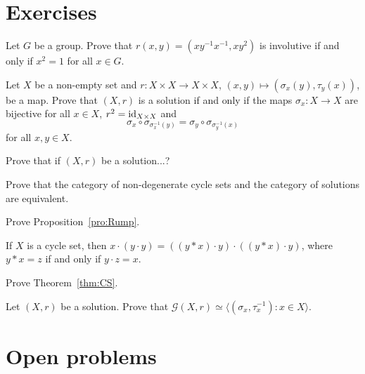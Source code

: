 \section*{Exercises}

\begin{prob}
\label{prob:Wada}
Let $G$ be a group. Prove that $r(x,y)=(xy^{-1}x^{-1},xy^2)$ 
is involutive if and only if $x^2=1$ for all $x\in G$. 
\end{prob}

\begin{prob}
Let $X$ be a  non-empty set and $r\colon X\times X\to X\times X$, $(x,y)\mapsto (\sigma_x(y),\tau_y(x))$, be a map.
Prove that $(X,r)$ is a solution if and only if 
the maps $\sigma_x\colon X\to X$ are bijective for all $x\in X$,
$r^2=\operatorname{id}_{X\times X}$ and 
\[
\sigma_x\circ\sigma_{\sigma^{-1}_x(y)}=\sigma_y\circ\sigma_{\sigma^{-1}_y(x)}
\]
for all $x,y\in X$. 
\end{prob}


\begin{prob}
Prove that if $(X,r)$ be a solution...? 
\end{prob}

\begin{prob}
\label{prob:cycle_sets}
Prove that the category of non-degenerate 
cycle sets and the category of solutions are equivalent. 
\end{prob}

\begin{prob}
\label{prob:Rump}
Prove Proposition~\ref{pro:Rump}. 
\end{prob}

\begin{prob}
If $X$ is a cycle set, then $x\cdot (y\cdot y)=((y*x)\cdot y)\cdot ((y*x)\cdot y)$, where
$y*x=z$ if and only if $y\cdot z=x$. 
\end{prob}

\begin{prob}
\label{prob:CS}
Prove Theorem~\ref{thm:CS}. 
\end{prob}

\begin{prob}
\label{prob:perm_group}
Let $(X,r)$ be a solution. Prove that $\mathcal{G}(X,r)\simeq\langle (\sigma_x,\tau^{-1}_x):x\in X\rangle$. 
\end{prob}

\section*{Open problems}

